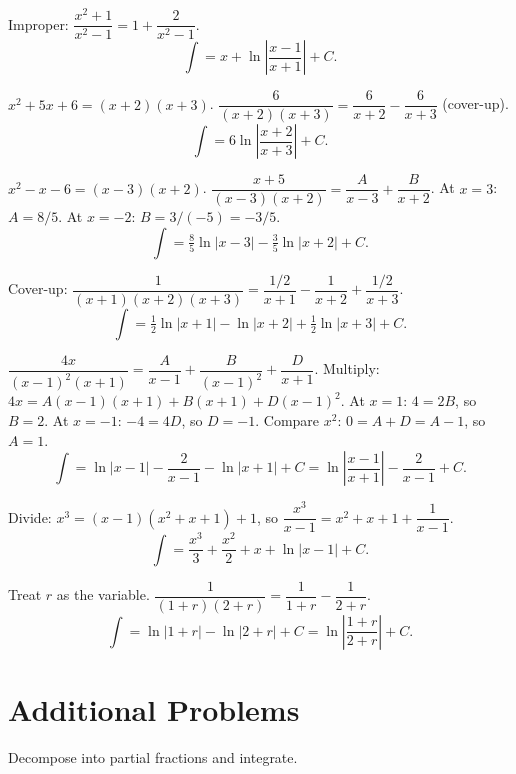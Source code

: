 \begin{solutions}
  \item Improper: $\dfrac{x^{2}+1}{x^{2}-1}=1+\dfrac{2}{x^{2}-1}$.
        \[
          \int = x+\ln\left|\frac{x-1}{x+1}\right|+C .
        \]

  \item $x^{2}+5x+6=(x+2)(x+3)$.
        $\dfrac{6}{(x+2)(x+3)}=\dfrac{6}{x+2}-\dfrac{6}{x+3}$ (cover-up).
        \[
          \int = 6\ln\left|\frac{x+2}{x+3}\right|+C .
        \]

  \item $x^{2}-x-6=(x-3)(x+2)$.
        $\dfrac{x+5}{(x-3)(x+2)}=\dfrac{A}{x-3}+\dfrac{B}{x+2}$. At
        $x=3$: $A=8/5$. At $x=-2$: $B=3/(-5)=-3/5$.
        \[
          \int = \tfrac85\ln|x-3|-\tfrac35\ln|x+2|+C .
        \]

  \item Cover-up:
        $\dfrac{1}{(x+1)(x+2)(x+3)}=\dfrac{1/2}{x+1}-\dfrac{1}{x+2}
        +\dfrac{1/2}{x+3}$.
        \[
          \int = \tfrac12\ln|x+1|-\ln|x+2|+\tfrac12\ln|x+3|+C .
        \]

  \item $\dfrac{4x}{(x-1)^{2}(x+1)}=\dfrac{A}{x-1}+\dfrac{B}{(x-1)^{2}}
        +\dfrac{D}{x+1}$. Multiply: $4x=A(x-1)(x+1)+B(x+1)+D(x-1)^{2}$.
        At $x=1$: $4=2B$, so $B=2$. At $x=-1$: $-4=4D$, so $D=-1$.
        Compare $x^{2}$: $0=A+D=A-1$, so $A=1$.
        \[
          \int = \ln|x-1|-\frac{2}{x-1}-\ln|x+1|+C
               = \ln\left|\frac{x-1}{x+1}\right|-\frac{2}{x-1}+C .
        \]

  \item Divide: $x^{3}=(x-1)(x^{2}+x+1)+1$, so
        $\dfrac{x^{3}}{x-1}=x^{2}+x+1+\dfrac{1}{x-1}$.
        \[
          \int = \frac{x^{3}}{3}+\frac{x^{2}}{2}+x+\ln|x-1|+C .
        \]

  \item Treat $r$ as the variable.
        $\dfrac{1}{(1+r)(2+r)}=\dfrac{1}{1+r}-\dfrac{1}{2+r}$.
        \[
          \int = \ln|1+r|-\ln|2+r|+C = \ln\left|\frac{1+r}{2+r}\right|+C .
        \]
\end{solutions}

\section{Additional Problems}

Decompose into partial fractions and integrate.

